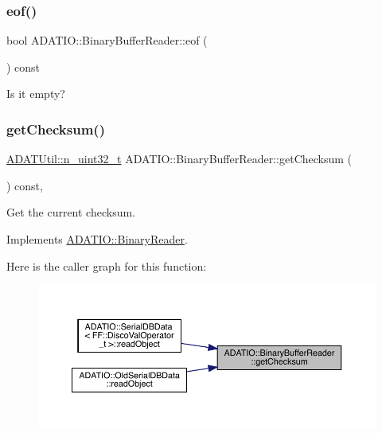 \subsubsection{\texorpdfstring{eof()}{eof()}\hspace{0.1cm}{\footnotesize\ttfamily [3/3]}}
{\footnotesize\ttfamily bool A\+D\+A\+T\+I\+O\+::\+Binary\+Buffer\+Reader\+::eof (\begin{DoxyParamCaption}{ }\end{DoxyParamCaption}) const}



Is it empty? 

\mbox{\label{classADATIO_1_1BinaryBufferReader_ae8e6c22be76223f5e2ce2613e70be4bf}} 
\subsubsection{\texorpdfstring{getChecksum()}{getChecksum()}\hspace{0.1cm}{\footnotesize\ttfamily [1/3]}}
{\footnotesize\ttfamily \mbox{\hyperlink{namespaceADATUtil_ad945a8afa4db2d1f89b731964adae97e}{A\+D\+A\+T\+Util\+::n\+\_\+uint32\+\_\+t}} A\+D\+A\+T\+I\+O\+::\+Binary\+Buffer\+Reader\+::get\+Checksum (\begin{DoxyParamCaption}{ }\end{DoxyParamCaption}) const\hspace{0.3cm}{\ttfamily [inline]}, {\ttfamily [virtual]}}



Get the current checksum. 



Implements \mbox{\hyperlink{classADATIO_1_1BinaryReader_acd705bb96d557a5437410b55beb40bda}{A\+D\+A\+T\+I\+O\+::\+Binary\+Reader}}.

Here is the caller graph for this function\+:
\nopagebreak
\begin{figure}[H]
\begin{center}
\leavevmode
\includegraphics[width=350pt]{d0/df3/classADATIO_1_1BinaryBufferReader_ae8e6c22be76223f5e2ce2613e70be4bf_icgraph}
\end{center}
\end{figure}
\mbox{\label{classADATIO_1_1BinaryBufferReader_ae8e6c22be76223f5e2ce2613e70be4bf}} 
